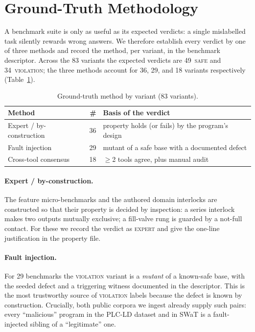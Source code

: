 \section{Ground-Truth Methodology}
\label{sec:groundtruth}

A benchmark suite is only as useful as its expected verdicts: a single mislabelled
task silently rewards wrong answers. We therefore establish every verdict by one of
three methods and record the method, per variant, in the benchmark descriptor.
Across the 83 variants the expected verdicts are 49~\textsc{safe} and
34~\textsc{violation}; the three methods account for 36, 29, and 18 variants
respectively (Table~\ref{tab:groundtruth}).

\begin{table}[t]
  \centering\small
  \caption{Ground-truth method by variant (83 variants).}
  \label{tab:groundtruth}
  \begin{tabular}{@{}lr l@{}}
    \toprule
    \textbf{Method} & \textbf{\#} & \textbf{Basis of the verdict}\\
    \midrule
    Expert / by-construction     & 36 & property holds (or fails) by the program's design\\
    Fault injection              & 29 & mutant of a safe base with a documented defect\\
    Cross-tool consensus         & 18 & $\geq$2 tools agree, plus manual audit\\
    \bottomrule
  \end{tabular}
\end{table}

\paragraph{Expert / by-construction.}
The feature micro-benchmarks and the authored domain interlocks are constructed so
that their property is decided by inspection: a series interlock makes two outputs
mutually exclusive; a fill-valve rung is guarded by a not-full contact. For these we
record the verdict as \textsc{expert} and give the one-line justification in the
property file.

\paragraph{Fault injection.}
For 29 benchmarks the \textsc{violation} variant is a \emph{mutant} of a known-safe
base, with the seeded defect and a triggering witness documented in the descriptor.
This is the most trustworthy source of \textsc{violation} labels because the defect is
known by construction. Crucially, both public corpora we ingest already supply such
pairs: every ``malicious'' program in the PLC-LD dataset and in SWaT is a
fault-injected sibling of a ``legitimate'' one.


